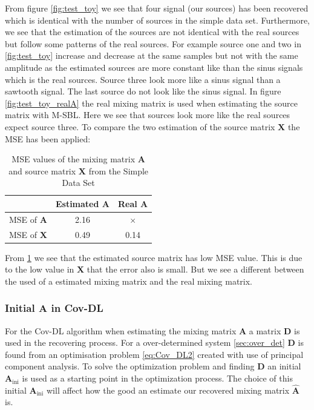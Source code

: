 \noindent
From figure \ref{fig:test_toy} we see that four signal (our sources) has been recovered which is identical with the number of sources in the simple data set. Furthermore, we see that the estimation of the sources are not identical with the real sources but follow some patterns of the real sources. For example source one and two in \ref{fig:test_toy} increase and decrease at the same samples but not with the same amplitude as the estimated sources are more constant like than the sinus signals which is the real sources. Source three look more like a sinus signal than a sawtooth signal. The last source do not look like the sinus signal.
In figure \ref{fig:test_toy_realA} the real mixing matrix is used when estimating the source matrix with M-SBL. Here we see that sources look more like the real sources expect source three.
To compare the two estimation of the source matrix $\mathbf{X}$ the MSE has been applied:
\begin{table}[H]
\centering
\begin{tabular}{|c|c|c|}
\hline
         & Estimated $\mathbf{A}$ & Real $\mathbf{A}$ \\ \hline
MSE of $\mathbf{A}$ & 2.16 & $\times$ \\ 
\hline 
MSE of $\mathbf{X}$ & 0.49 & 0.14 \\ 
\hline
\end{tabular} 
\caption{MSE values of the mixing matrix $\mathbf{A}$ and source matrix $\mathbf{X}$ from the Simple Data Set}
\label{tab:test}
\end{table}
\noindent
From \ref{tab:test} we see that the estimated source matrix has low MSE value. This is due to the low value in $\mathbf{X}$ that the error also is small. But we see a different between the used of a estimated mixing matrix and the real mixing matrix.

\subsubsection{Initial A in Cov-DL}
For the Cov-DL algorithm when estimating the mixing matrix $\mathbf{A}$ a matrix $\mathbf{D}$ is used in the recovering process. For a over-determined system \ref{sec:over_det} $\mathbf{D}$ is found from an optimisation problem \eqref{eq:Cov_DL2} created with use of principal component analysis. To solve the optimization problem and finding $\mathbf{D}$ an initial $\mathbf{A}_{\text{ini}}$ is used as a starting point in the optimization process. The choice of this initial $\mathbf{A}_{\text{ini}}$ will affect how the good an estimate our recovered mixing matrix $\hat{\mathbf{A}}$ is.

